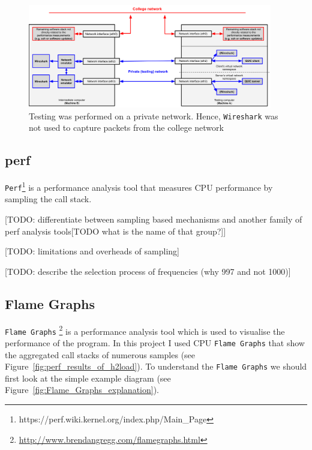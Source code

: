\documentclass[12pt,a4paper,twoside,openright]{report}
\begin{document}
    \begin{figure}[H]
    \centering
    \includegraphics[width=0.95\textwidth]{figs/Wireshark_separation.png}
    \caption{Testing was performed on a private network. Hence, \texttt{Wireshark} was not used to capture packets from the college network}
    \label{fig:Wireshark_separation}
    \end{figure}



\subsection{perf}
\texttt{Perf}\footnote{https://perf.wiki.kernel.org/index.php/Main\_Page} is a performance analysis tool that measures CPU performance by sampling the call stack.

[TODO: differentiate between sampling based mechanisms and another family of perf analysis tools[TODO what is the name of that group?]]

[TODO: limitations and overheads of sampling]

[TODO: describe the selection process of frequencies (why 997 and not 1000)]



\subsection{Flame Graphs}
\texttt{Flame Graphs} \footnote{\url{http://www.brendangregg.com/flamegraphs.html}} is a performance analysis tool which is used to visualise the performance of the program.
In this project I used CPU \texttt{Flame Graphs} that show the aggregated call stacks of numerous samples (see Figure~\ref{fig:perf_results_of_h2load}).
To understand the \texttt{Flame Graphs} we should first look at the simple example diagram (see Figure~\ref{fig:Flame_Graphs_explanation}).
\end{document}
